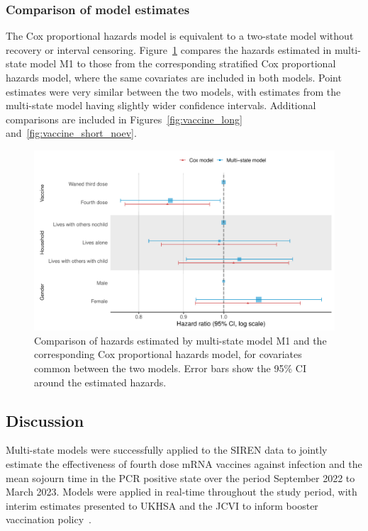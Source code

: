 \subsubsection{Comparison of model estimates}

The Cox proportional hazards model is equivalent to a two-state model without recovery or interval censoring. Figure~\ref{fig:vaccine_short} compares the hazards estimated in multi-state model M1 to those from the corresponding stratified Cox proportional hazards model, where the same covariates are included in both models. Point estimates were very similar between the two models, with estimates from the multi-state model having slightly wider confidence intervals. Additional comparisons are included in Figures~\ref{fig:vaccine_long} and~\ref{fig:vaccine_short_noev}.

\begin{figure}[htbp!]
    \centering
    \includegraphics[width=\textwidth]{vaccine_short.pdf}
    \caption[Comparison of hazards estimated by multi-state and Cox proportional hazards model]{Comparison of hazards estimated by multi-state model M1 and the corresponding Cox proportional hazards model, for covariates common between the two models. Error bars show the 95\% CI around the estimated hazards.}\label{fig:vaccine_short}
\end{figure}

\subsection{Discussion}

Multi-state models were successfully applied to the SIREN data to jointly estimate the effectiveness of fourth dose mRNA vaccines against infection and the mean sojourn time in the PCR positive state over the period September 2022 to March 2023. Models were applied in real-time throughout the study period, with interim estimates presented to UKHSA and the JCVI to inform booster vaccination policy~\parencite{Department-of-Health-and-Social-Care2023-um}.

